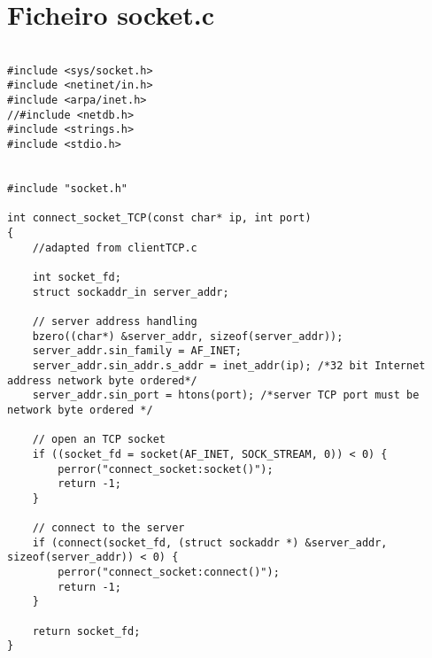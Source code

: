 \section{Ficheiro socket.c}
\label{SOCKETC}

\begin{lstlisting}

#include <sys/socket.h>
#include <netinet/in.h>
#include <arpa/inet.h>
//#include <netdb.h>
#include <strings.h>
#include <stdio.h>


#include "socket.h"

int connect_socket_TCP(const char* ip, int port)
{
	//adapted from clientTCP.c
	
	int socket_fd;
	struct sockaddr_in server_addr;

	// server address handling
	bzero((char*) &server_addr, sizeof(server_addr));
	server_addr.sin_family = AF_INET;
	server_addr.sin_addr.s_addr = inet_addr(ip); /*32 bit Internet address network byte ordered*/
	server_addr.sin_port = htons(port); /*server TCP port must be network byte ordered */

	// open an TCP socket
	if ((socket_fd = socket(AF_INET, SOCK_STREAM, 0)) < 0) {
		perror("connect_socket:socket()");
		return -1;
	}

	// connect to the server
	if (connect(socket_fd, (struct sockaddr *) &server_addr, sizeof(server_addr)) < 0) {
		perror("connect_socket:connect()");
		return -1;
	}

	return socket_fd;
}

\end{lstlisting}
